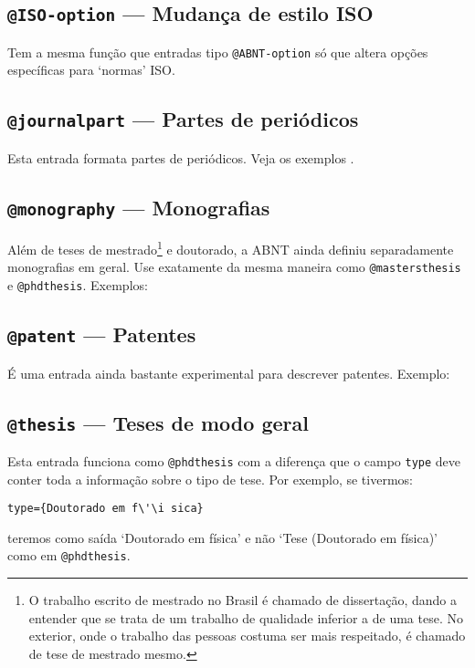 \documentclass[a4paper]{ltxdoc}
\begin{document}
\subsection{{\tt @ISO-option} --- Mudança de estilo ISO}

Tem a mesma função que entradas tipo {\tt @ABNT-option} só que altera
opções específicas para `normas' ISO.

\subsection{{\tt @journalpart} --- Partes de periódicos }

Esta entrada formata partes de periódicos. Veja os exemplos
.

\subsection{{\tt @monography} --- Monografias}

Além de teses de mestrado\footnote{O trabalho escrito de mestrado no Brasil
é chamado de dissertação, dando a entender que se trata de um trabalho
de qualidade inferior a de uma tese. No exterior, onde o trabalho das pessoas
costuma ser mais respeitado, é chamado de tese de mestrado mesmo.}
 e doutorado, a ABNT ainda definiu separadamente monografias em geral.
Use exatamente da mesma maneira como {\tt @mastersthesis} e {\tt @phdthesis}.
Exemplos: 

\subsection{{\tt @patent} --- Patentes}

É uma entrada ainda bastante experimental para descrever patentes.
Exemplo: 

\subsection{{\tt @thesis} --- Teses de modo geral}

Esta entrada funciona como {\tt @phdthesis} com a diferença que o 
campo {\tt type} deve conter toda a informação sobre o tipo de tese. 
Por exemplo, se tivermos:
\begin{verbatim}
type={Doutorado em f\'\i sica}
\end{verbatim}
teremos como saída `Doutorado em física' e não
`Tese (Doutorado em física)' como em {\tt @phdthesis}.
\end{document}

